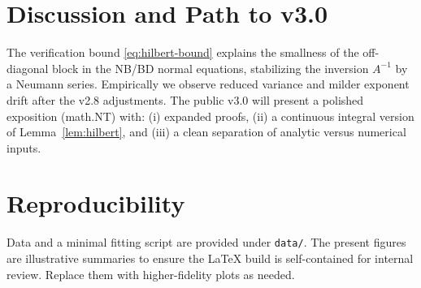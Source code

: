 \documentclass[11pt]{article}
\theoremstyle{remark}
\begin{document}
\section{Discussion and Path to v3.0}
The verification bound \eqref{eq:hilbert-bound} explains the smallness of the off-diagonal block in the NB/BD normal equations,
stabilizing the inversion $A^{-1}$ by a Neumann series. Empirically we observe reduced variance and milder exponent drift after
the v2.8 adjustments. The public v3.0 will present a polished exposition (math.NT) with: (i) expanded proofs,
(ii) a continuous integral version of Lemma~\ref{lem:hilbert}, and (iii) a clean separation of analytic versus numerical inputs.

\section*{Reproducibility}
Data and a minimal fitting script are provided under \texttt{data/}. The present figures are illustrative summaries to ensure the
LaTeX build is self-contained for internal review. Replace them with higher-fidelity plots as needed.

\appendix

\end{document}
